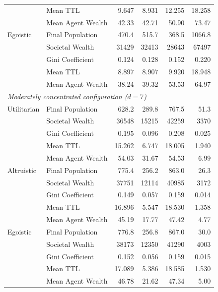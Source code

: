 \documentclass{icsthesis}
\begin{document}
\begin{mainmatter}
\begin{longtable}{l l r r r r}
		            & Mean TTL              & 9.647  & 8.931  & 12.255 & 18.258 \\
		            & Mean Agent Wealth     & 42.33  & 42.71  & 50.90  & 73.47  \\
		Egoistic    & Final Population      & 470.4  & 515.7  & 368.5  & 1066.8 \\
		            & Societal Wealth       & 31429  & 32413  & 28643  & 67497  \\
		            & Gini Coefficient      & 0.124  & 0.128  & 0.152  & 0.220  \\
		            & Mean TTL              & 8.897  & 8.907  & 9.920  & 18.948 \\
		            & Mean Agent Wealth     & 38.24  & 39.32  & 53.53  & 64.97  \\
		\hline
		\multicolumn{6}{l}{\textit{Moderately concentrated configuration ($d = 7$)}} \\
		\hline
		Utilitarian & Final Population      & 628.2  & 289.8  & 767.5  & 51.3  \\
		            & Societal Wealth       & 36548  & 15215  & 42259  & 3370  \\
		            & Gini Coefficient      & 0.195  & 0.096  & 0.208  & 0.025 \\
		            & Mean TTL              & 15.262 & 6.747  & 18.005 & 1.940 \\
		            & Mean Agent Wealth     & 54.03  & 31.67  & 54.53  & 6.99  \\
		Altruistic  & Final Population      & 775.4  & 256.2  & 863.0  & 26.3  \\
		            & Societal Wealth       & 37751  & 12114  & 40985  & 3172  \\
		            & Gini Coefficient      & 0.149  & 0.057  & 0.159  & 0.014 \\
		            & Mean TTL              & 16.896 & 5.547  & 18.530 & 1.358 \\
		            & Mean Agent Wealth     & 45.19  & 17.77  & 47.42  & 4.77  \\
		Egoistic    & Final Population      & 776.8  & 256.8  & 867.0  & 30.0  \\
		            & Societal Wealth       & 38173  & 12350  & 41290  & 4003  \\
		            & Gini Coefficient      & 0.152  & 0.056  & 0.159  & 0.015 \\
		            & Mean TTL              & 17.089 & 5.386  & 18.585 & 1.530 \\
		            & Mean Agent Wealth     & 46.78  & 21.62  & 47.34  & 5.00  \\

\end{longtable}
\end{mainmatter}
\end{document}
